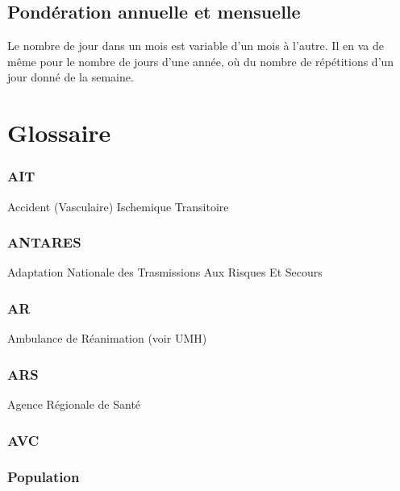 \documentclass[12pt,english,french,twoside]{report}\usepackage[]{graphicx}\usepackage[]{color}
\begin{document}
\section*{Pondération annuelle et mensuelle}
Le nombre de jour dans un mois est variable d'un mois à l'autre. Il en va de même pour le nombre de jours d'une année, où du nombre de répétitions d'un jour donné de la semaine.

\chapter{Glossaire}





\subsection*{AIT}
Accident (Vasculaire) Ischemique Transitoire

\subsection*{ANTARES}
Adaptation Nationale des Trasmissions Aux Risques Et Secours

\subsection*{AR}
Ambulance de Réanimation (voir UMH)

\subsection*{ARS}
Agence Régionale de Santé

\subsection*{AVC}

\subsection*{Population}
\end{document}
